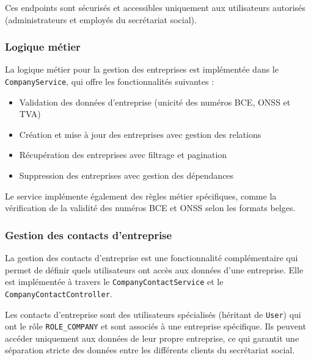 \vspace{0.5cm}

\begin{note}
Ces endpoints sont sécurisés et accessibles uniquement aux utilisateurs autorisés (administrateurs et employés du secrétariat social).
\end{note}
\newpage

\subsubsection{Logique métier}

La logique métier pour la gestion des entreprises est implémentée dans le \texttt{CompanyService}, qui offre les fonctionnalités suivantes :

\vspace{0.5cm}

\begin{itemize}[leftmargin=*,label=\textcolor{darkgray}{$\bullet$},itemsep=0.3em]
  \item Validation des données d'entreprise (unicité des numéros BCE, ONSS et TVA)
  \item Création et mise à jour des entreprises avec gestion des relations
  \item Récupération des entreprises avec filtrage et pagination
  \item Suppression des entreprises avec gestion des dépendances
\end{itemize}

\vspace{0.5cm}

Le service implémente également des règles métier spécifiques, comme la vérification de la validité des numéros BCE et ONSS selon les formats belges.

\subsubsection{Gestion des contacts d'entreprise}

La gestion des contacts d'entreprise est une fonctionnalité complémentaire qui permet de définir quels utilisateurs ont accès aux données d'une entreprise. Elle est implémentée à travers le \texttt{CompanyContactService} et le \texttt{CompanyContactController}.

\vspace{0.5cm}

\begin{tcolorbox}[
  title={\textbf{Accès sécurisé par entreprise}},
  colback=blue!5!white,
  colframe=primarycolor,
  fonttitle=\bfseries,
  boxrule=0.5mm,
  arc=2mm,
  left=6mm,
  right=6mm,
  top=6mm,
  bottom=6mm
]
Les contacts d'entreprise sont des utilisateurs spécialisés (héritant de \texttt{User}) qui ont le rôle \texttt{ROLE\_COMPANY} et sont associés à une entreprise spécifique. Ils peuvent accéder uniquement aux données de leur propre entreprise, ce qui garantit une séparation stricte des données entre les différents clients du secrétariat social.
\end{tcolorbox}


